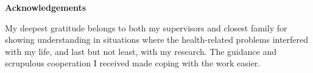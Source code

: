 \thispagestyle{plain}

\mbox{}
\vfill

\large
\textbf{Acknowledgements}
\vspace*{1cm}

\normalsize
My deepest gratitude belongs to both my supervisors and closest family for showing understanding in situations where the health-related problems interfered with my life, and last but not least, with my research. The guidance and scrupulous cooperation I received made coping with the work easier.